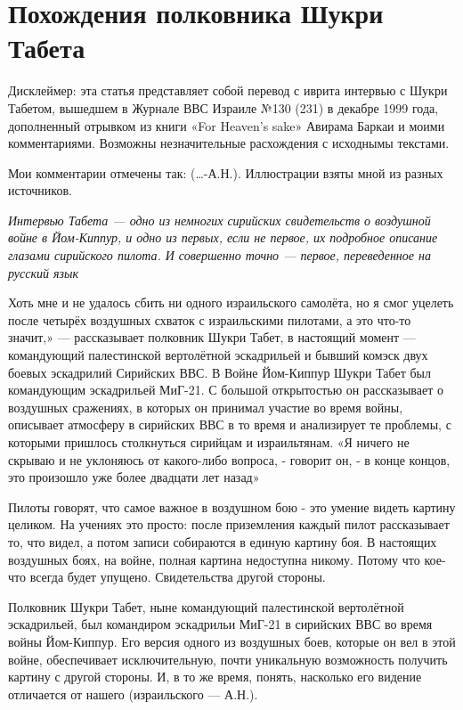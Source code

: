 \chapter{Похождения полковника Шукри Табета}

\begin{remark}
	Дисклеймер: эта статья представляет собой перевод с иврита интервью с Шукри Табетом, вышедшем в Журнале ВВС Израиле №130 (231) в декабре 1999 года, дополненный отрывком из книги «For Heaven's sake» Авирама Баркаи и моими комментариями. Возможны незначительные расхождения с исходнымы текстами.
	
	Мои комментарии отмечены так: (…-А.Н.). Иллюстрации взяты мной из разных источников.
\end{remark}


\textit{Интервью Табета — одно из немногих сирийских свидетельств о воздушной войне в Йом-Киппур, и одно из первых, если не первое, их подробное описание глазами сирийского пилота. И совершенно точно — первое, переведенное на русский язык}


Хоть мне и не удалось сбить ни одного израильского самолёта, но я смог уцелеть после четырёх воздушных схваток с израильскими пилотами, а это что-то значит,» — рассказывает полковник Шукри Табет, в настоящий момент — командующий палестинской вертолётной эскадрильей и бывший комэск двух боевых эскадрилий Сирийских ВВС. В Войне Йом-Киппур Шукри Табет был командующим эскадрильей МиГ-21. С большой открытостью он рассказывает о воздушных сражениях, в которых он принимал участие во время войны, описывает атмосферу в сирийских ВВС в то время и анализирует те проблемы, с которыми пришлось столкнуться сирийцам и израильтянам. «Я ничего не скрываю и не уклоняюсь от какого-либо вопроса, - говорит он, - в конце концов, это произошло уже более двадцати лет назад»

Пилоты говорят, что самое важное в воздушном бою - это умение видеть картину целиком. На учениях это просто: после приземления каждый пилот рассказывает то, что видел, а потом записи собираются в единую картину боя. В настоящих воздушных боях, на войне, полная картина недоступна никому. Потому что кое-что всегда будет упущено. Свидетельства другой стороны.

Полковник Шукри Табет, ныне командующий палестинской вертолётной эскадрильей, был командиром эскадрильи МиГ-21 в сирийских ВВС во время войны Йом-Киппур. Его версия одного из воздушных боев, которые он вел в этой войне, обеспечивает исключительную, почти уникальную возможность получить картину с другой стороны. И, в то же время, понять, насколько его видение отличается от нашего (израильского — А.Н.).

